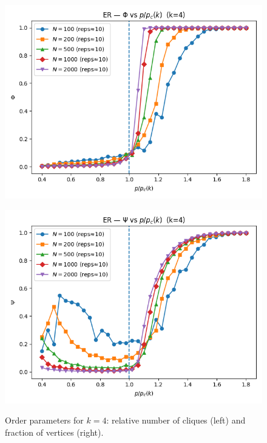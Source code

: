 \begin{figure}[h!]
    \centering
    \setlength{\tabcolsep}{2pt}
    \begin{minipage}[t]{0.48\textwidth}
        \centering
        \includegraphics[width=\textwidth]{images/IMAGES TASK2/ER_phi_k4.png}
        \label{fig:phi_k4}
    \end{minipage}
    \hfill
    \begin{minipage}[t]{0.48\textwidth}
        \centering
        \includegraphics[width=\textwidth]{images/IMAGES TASK2/ER_psi_k4.png}
        \label{fig:psi_k4}
    \end{minipage}
    \caption{Order parameters for $k=4$: relative number of cliques (left) and fraction of vertices (right).}
    \label{fig:orderparam_k4}
\end{figure}

